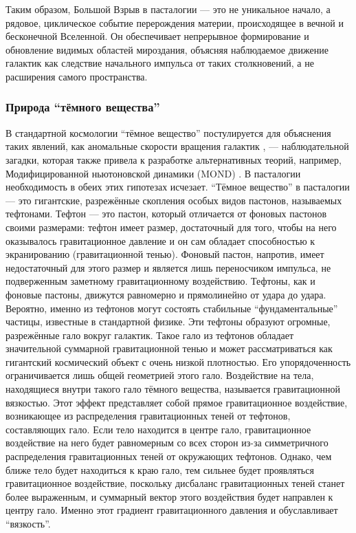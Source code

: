 \documentclass[pdflatex,sn-mathphys-num,referee]{sn-jnl}
\begin{document}
Таким образом, Большой Взрыв в пасталогии --- это не уникальное начало, а рядовое, циклическое событие перерождения материи, происходящее в вечной и бесконечной Вселенной. Он обеспечивает непрерывное формирование и обновление видимых областей мироздания, объясняя наблюдаемое движение галактик как следствие начального импульса от таких столкновений, а не расширения самого пространства.

\subsubsection{Природа ``тёмного вещества''}\label{subsubsec:dark-matter}

В стандартной космологии ``тёмное вещество'' постулируется для объяснения таких явлений, как аномальные скорости вращения галактик \cite{rubin1980}, --- наблюдательной загадки, которая также привела к разработке альтернативных теорий, например, Модифицированной ньютоновской динамики (MOND) \cite{milgrom1983-mond}. В пасталогии необходимость в обеих этих гипотезах исчезает.
``Тёмное вещество'' в пасталогии --- это гигантские, разрежённые скопления особых видов пастонов, называемых тефтонами. Тефтон --- это пастон, который отличается от фоновых пастонов своими размерами: тефтон имеет размер, достаточный для того, чтобы на него оказывалось гравитационное давление и он сам обладает способностью к экранированию (гравитационной тенью). Фоновый пастон, напротив, имеет недостаточный для этого размер и является лишь переносчиком импульса, не подверженным заметному гравитационному воздействию. Тефтоны, как и фоновые пастоны, движутся равномерно и прямолинейно от удара до удара. Вероятно, именно из тефтонов могут состоять стабильные ``фундаментальные'' частицы, известные в стандартной физике.
Эти тефтоны образуют огромные, разрежённые гало вокруг галактик. Такое гало из тефтонов обладает значительной суммарной гравитационной тенью и может рассматриваться как гигантский космический объект с очень низкой плотностью. Его упорядоченность ограничивается лишь общей геометрией этого гало.
Воздействие на тела, находящиеся внутри такого гало тёмного вещества, называется гравитационной вязкостью. Этот эффект представляет собой прямое гравитационное воздействие, возникающее из распределения гравитационных теней от тефтонов, составляющих гало. Если тело находится в центре гало, гравитационное воздействие на него будет равномерным со всех сторон из-за симметричного распределения гравитационных теней от окружающих тефтонов. Однако, чем ближе тело будет находиться к краю гало, тем сильнее будет проявляться гравитационное воздействие, поскольку дисбаланс гравитационных теней станет более выраженным, и суммарный вектор этого воздействия будет направлен к центру гало. Именно этот градиент гравитационного давления и обуславливает ``вязкость''.
\end{document}
